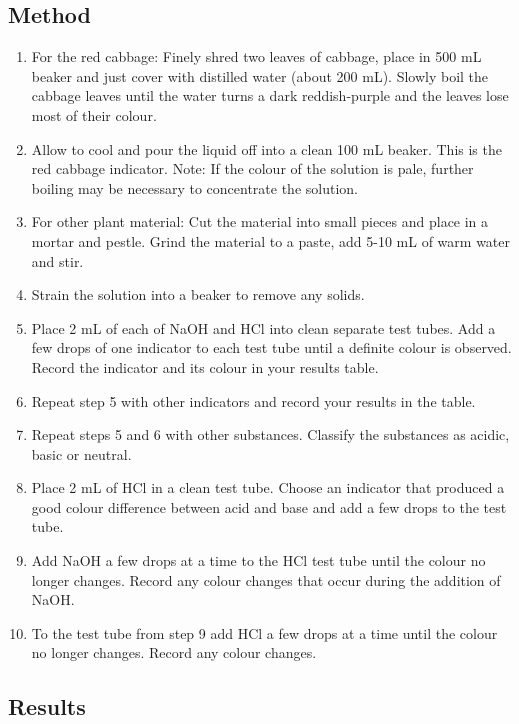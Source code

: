	\subsection{Method}
		\begin{enumerate}
			\item For the red cabbage: Finely shred two leaves of cabbage, place in 500 mL beaker and just cover with distilled water (about 200 mL). Slowly boil the cabbage leaves until the water turns a dark reddish-purple and the leaves lose most of their colour.
			\item Allow to cool and pour the liquid off into a clean 100 mL beaker. This is the red cabbage indicator. Note: If the colour of the solution is pale, further boiling may be necessary to concentrate the solution.
			\item For other plant material: Cut the material into small pieces and place in a mortar and pestle. Grind the material to a paste, add 5-10 mL of warm water and stir.
			\item Strain the solution into a beaker to remove any solids.
			\item Place 2 mL of each of NaOH and HCl into clean separate test tubes. Add a few drops of one indicator to each test tube until a definite colour is observed. Record the indicator and its colour in your results table.
			\item Repeat step 5 with other indicators and record your results in the table. 
			\item Repeat steps 5 and 6 with other substances. Classify the substances as acidic, basic or neutral.
			\item Place 2 mL of HCl in a clean test tube. Choose an indicator that produced a good colour difference between acid and base and add a few drops to the test tube.
			\item Add NaOH a few drops at a time to the HCl test tube until the colour no longer changes. Record any colour changes that occur during the addition of NaOH.
			\item To the test tube from step 9 add HCl a few drops at a time until the colour no longer changes. Record any colour changes.
		\end{enumerate}

	\subsection{Results}

